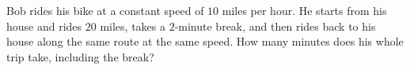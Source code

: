 Bob rides his bike at a constant speed of $10$ miles per hour. He starts from his house and rides $20$ miles, takes a $2$-minute break, and then rides back to his house along the same route at the same speed. How many minutes does his whole trip take, including the break?
